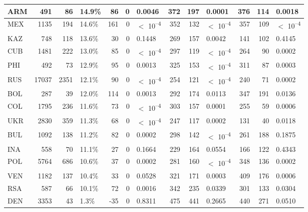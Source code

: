 \begin{tabular}{l|r|r|l|r|r|l|r|r|l|r|r|l}
\hline
ARM & 491 & 86 & 14.9\% & 86 & 0 & 0.0046 & 372 & 197 & 0.0001 & 376 & 114 & 0.0018\\
\hline
MEX & 1135 & 194 & 14.6\% & 161 & 0 & $<$ 10\textsuperscript{--4} & 352 & 132 & $<$ 10\textsuperscript{--4} & 357 & 109 & $<$ 10\textsuperscript{--4}\\
\hline
KAZ & 748 & 118 & 13.6\% & 30 & 0 & 0.1448 & 269 & 157 & 0.0042 & 141 & 102 & 0.4145\\
\hline
CUB & 1481 & 222 & 13.0\% & 85 & 0 & $<$ 10\textsuperscript{--4} & 297 & 119 & $<$ 10\textsuperscript{--4} & 264 & 90 & 0.0002\\
\hline
PHI & 492 & 73 & 12.9\% & 95 & 0 & 0.0013 & 325 & 153 & $<$ 10\textsuperscript{--4} & 311 & 87 & 0.0003\\
\hline
RUS & 17037 & 2351 & 12.1\% & 90 & 0 & $<$ 10\textsuperscript{--4} & 254 & 121 & $<$ 10\textsuperscript{--4} & 240 & 71 & 0.0002\\
\hline
BOL & 287 & 39 & 12.0\% & 114 & 0 & 0.0013 & 292 & 174 & 0.0113 & 347 & 191 & 0.0136\\
\hline
COL & 1795 & 236 & 11.6\% & 73 & 0 & $<$ 10\textsuperscript{--4} & 303 & 157 & 0.0001 & 255 & 59 & 0.0006\\
\hline
UKR & 2830 & 359 & 11.3\% & 68 & 0 & $<$ 10\textsuperscript{--4} & 247 & 117 & 0.0002 & 131 & 40 & 0.0118\\
\hline
BUL & 1092 & 138 & 11.2\% & 82 & 0 & 0.0002 & 298 & 142 & $<$ 10\textsuperscript{--4} & 261 & 188 & 0.1875\\
\hline
INA & 558 & 70 & 11.1\% & 27 & 0 & 0.1664 & 229 & 164 & 0.0554 & 166 & 122 & 0.4343\\
\hline
POL & 5764 & 686 & 10.6\% & 37 & 0 & 0.0002 & 281 & 160 & $<$ 10\textsuperscript{--4} & 348 & 136 & 0.0002\\
\hline
VEN & 1182 & 137 & 10.4\% & 33 & 0 & 0.0528 & 321 & 171 & 0.0003 & 409 & 176 & 0.0006\\
\hline
RSA & 587 & 66 & 10.1\% & 72 & 0 & 0.0016 & 342 & 235 & 0.0339 & 301 & 133 & 0.0304\\
\hline
DEN & 3353 & 43 & 1.3\% & -35 & 0 & 0.8311 & 475 & 441 & 0.2665 & 440 & 271 & 0.0510\\
\hline
\end{tabular}

